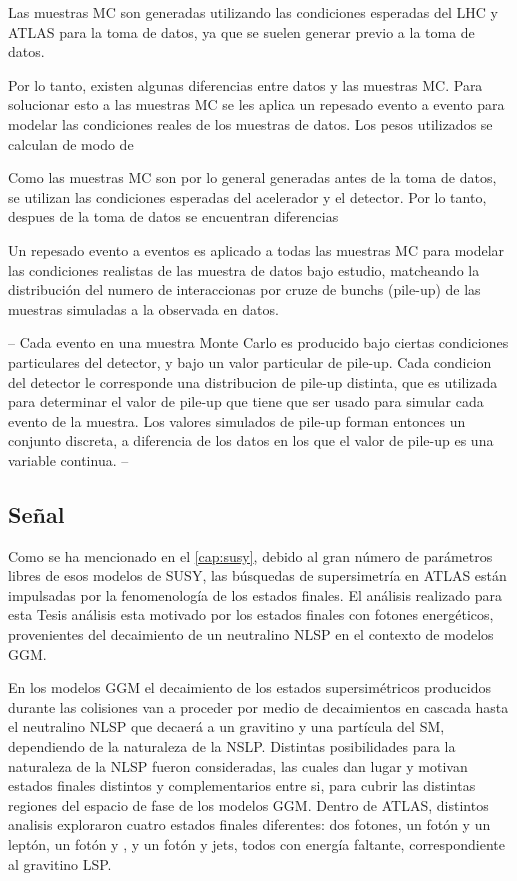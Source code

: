 Las muestras MC son generadas utilizando las condiciones esperadas del LHC y
ATLAS para la toma de datos, ya que se suelen generar previo a la toma de datos.

Por lo tanto, existen algunas diferencias entre datos y las muestras MC. Para
solucionar esto a las muestras MC se les aplica un repesado evento a evento
para modelar las condiciones reales de los muestras de datos. Los pesos
utilizados se calculan de modo de


Como las muestras MC son por lo general generadas antes de la toma de datos,
se utilizan las condiciones esperadas del acelerador y el detector.
Por lo tanto, despues de la toma de datos se encuentran diferencias

Un repesado evento a eventos es aplicado a todas las muestras MC para modelar las condiciones
realistas de las muestra de datos bajo estudio, matcheando la distribución del numero de interaccionas
por cruze de bunchs (pile-up) de las muestras simuladas a la observada en datos.

--
Cada evento en una muestra Monte Carlo es producido bajo ciertas condiciones particulares del detector, y bajo un valor particular de pile-up.
Cada condicion del detector le corresponde una distribucion  de pile-up distinta, que es utilizada para determinar el valor de pile-up que
tiene que ser usado para simular cada evento de la muestra. Los valores simulados de pile-up forman entonces un conjunto discreta, a
diferencia de los datos en los que el valor de pile-up es una variable continua.
--



\subsection{Se\~nal}

Como se ha mencionado en el \cref{cap:susy}, debido al gran número de parámetros
libres de esos modelos de SUSY, las búsquedas de supersimetría en ATLAS están
impulsadas por la fenomenología de los estados finales. El análisis realizado
para esta Tesis análisis esta motivado por los estados finales con fotones
energéticos, provenientes del decaimiento de un neutralino NLSP en el contexto
de modelos GGM.

En los modelos GGM el decaimiento de los estados supersimétricos producidos
durante las colisiones van a proceder por medio de decaimientos en cascada hasta
el neutralino NLSP que decaerá a un gravitino y una partícula del SM,
dependiendo de la naturaleza de la NSLP. Distintas posibilidades para la
naturaleza de la NLSP fueron consideradas, las cuales dan lugar y motivan
estados finales distintos y complementarios entre si, para cubrir las distintas
regiones del espacio de fase de los modelos GGM. Dentro de ATLAS, distintos
analisis exploraron cuatro estados finales diferentes: dos fotones, un fotón y
un leptón, un fotón y {\bjets}, y un fotón y jets, todos con energía faltante,
correspondiente al gravitino LSP.

